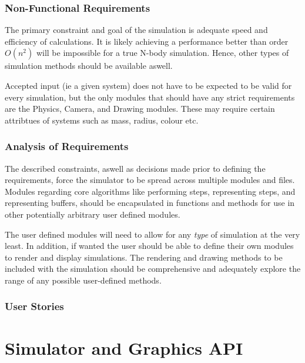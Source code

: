 \documentclass{report}
\begin{document}
      \subsection{Non-Functional Requirements}
        The primary constraint and goal of the simulation is adequate speed and efficiency of calculations.
        It is likely achieving a performance better than order $O(n^2)$ will be impossible for a true
        N-body simulation. Hence, other types of simulation methods should be available aswell.

        Accepted input (ie a given system) does not have to be expected to be valid for
        every simulation, but the only modules that should have any strict requirements
        are the Physics, Camera, and Drawing modules. These may require certain attribtues of
        systems such as mass, radius, colour etc.
      \subsection{Analysis of Requirements}
        The described constraints, aswell as decisions made prior to defining the requirements,
        force the simulator to be spread across multiple modules and files. Modules regarding
        core algorithms like performing steps, representing steps, and representing buffers,
        should be encapsulated in functions and methods for use in other potentially
        arbitrary user defined modules. 
        
        The user defined modules will need to allow
        for any \textit{type} of simulation at the very least. In addition, if wanted
        the user should be able to define their own modules to render and display simulations.
        The rendering and drawing methods to be included with the simulation should be
        comprehensive and adequately explore the range of any possible user-defined methods.
      \subsection{User Stories}
        
  \chapter{Simulator and Graphics API}
\end{document}
